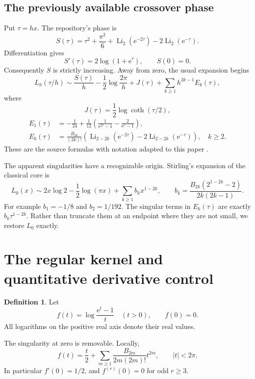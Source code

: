 \documentclass[11pt,a4paper]{article}
\numberwithin{equation}{section}
\theoremstyle{definition}
\newtheorem{definition}[theorem]{Definition}
\newcommand{\ee}{\mathrm e}
\newcommand{\Li}{\operatorname{Li}}
\begin{document}
\subsection{The previously available crossover phase}
Put $\tau=hx$. The repository's phase is
\begin{equation}
S(\tau)=\tau^2+\frac{\pi^2}{6}
       +\Li_2(\ee^{-2\tau})-2\Li_2(\ee^{-\tau}).
\label{eq:S}
\end{equation}
Differentiation gives
\[
S'(\tau)=2\log(1+\ee^\tau),\qquad S(0)=0.
\]
Consequently $S$ is strictly increasing. Away from zero, the usual expansion begins
\begin{equation}
L_h(\tau/h)\sim\frac{S(\tau)}h
 -\frac12\log\frac{2\pi}{h}+J(\tau)
 +\sum_{k\ge1}h^{2k-1}E_k(\tau),
\label{eq:outer}
\end{equation}
where
\[
J(\tau)=\frac12\log\coth(\tau/2),
\]
\begin{align}
E_1(\tau)&=-\frac1{24}+\frac1{12}
 \left(\frac1{\ee^{2\tau}-1}-\frac2{\ee^\tau-1}\right),\label{eq:E1}\\
E_k(\tau)&=\frac{B_{2k}}{(2k)!}
 \left(\Li_{2-2k}(\ee^{-2\tau})-2\Li_{2-2k}(\ee^{-\tau})\right),
 \quad k\ge2.\label{eq:Ek}
\end{align}
These are the source formulas with notation adapted to this paper \cite{repo}.

The apparent singularities have a recognizable origin. Stirling's expansion of the classical core is
\begin{equation}
L_0(x)\sim 2x\log2-\frac12\log(\pi x)
 +\sum_{k\ge1}b_kx^{1-2k},\qquad
b_k=\frac{B_{2k}(2^{1-2k}-2)}{2k(2k-1)}.
\label{eq:stirlingcore}
\end{equation}
For example $b_1=-1/8$ and $b_2=1/192$. The singular terms in $E_k(\tau)$ are exactly $b_k\tau^{1-2k}$. Rather than truncate them at an endpoint where they are not small, we restore $L_0$ exactly.

\section{The regular kernel and quantitative derivative control}
\label{sec:kernel}

\begin{definition}
Let
\begin{equation}
f(t)=\log\frac{\ee^t-1}{t}\quad(t>0),\qquad f(0)=0.
\label{eq:f}
\end{equation}
All logarithms on the positive real axis denote their real values.
\end{definition}
The singularity at zero is removable. Locally,
\begin{equation}
f(t)=\frac t2+\sum_{m\ge1}
       \frac{B_{2m}}{2m(2m)!}t^{2m},\qquad |t|<2\pi.
\label{eq:ftaylor}
\end{equation}
In particular $f'(0)=1/2$, and $f^{(r)}(0)=0$ for odd $r\ge3$.
\end{document}
